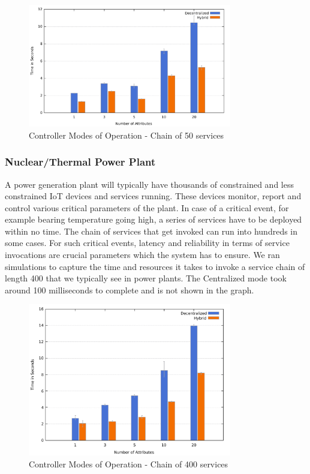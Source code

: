 \documentclass[journal]{IEEEtran}
\begin{document}
\begin{figure}[htbp]
\centerline{\includegraphics[width=3.5in]{100services.pdf}}
\caption{Controller Modes of Operation - Chain of 50 services}
\label{fig:cont_home}
\end{figure}

\subsubsection{Nuclear/Thermal Power Plant}
A power generation plant will typically have thousands of constrained and less constrained IoT devices and services running. These devices monitor, report and control various critical parameters of the plant. In case of a critical event, for example bearing temperature going high, a series of services have to be deployed within no time. The chain of services that get invoked can run into hundreds in some cases. For such critical events, latency and reliability in terms of service invocations are crucial parameters which the system has to ensure. We ran simulations to capture the time and resources it takes to invoke a service chain of length 400 that we typically see in power plants. The Centralized mode took around 100 milliseconds to complete and is not shown in the graph.

\begin{figure}[htbp]
\centerline{\includegraphics[width=3.5in]{500services.pdf}}
\caption{Controller Modes of Operation - Chain of 400 services}
\label{fig:cont_power}
\end{figure}
\end{document}
